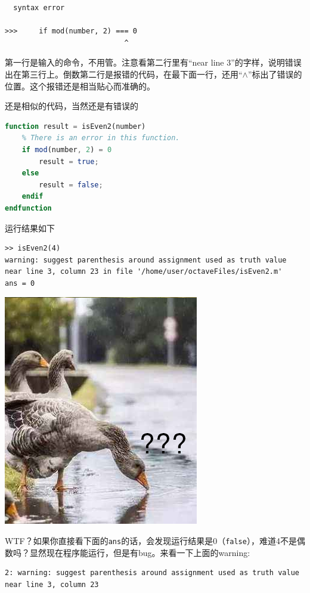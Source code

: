 \documentclass[12pt]{article}
\begin{document}
\begin{spacing}{1.4}
\begin{lstlisting}
  syntax error

>>>     if mod(number, 2) === 0
                            ^
\end{lstlisting}

第一行是输入的命令，不用管。注意看第二行里有“near line 3”的字样，说明错误出在第三行上。倒数第二行是报错的代码，在最下面一行，还用“$\wedge$”标出了错误的位置。这个报错还是相当贴心而准确的。

还是相似的代码，当然还是有错误的

\begin{lstlisting}[language=octave]
function result = isEven2(number)
    % There is an error in this function.
    if mod(number, 2) = 0
        result = true;
    else
        result = false;
    endif
endfunction
\end{lstlisting}

运行结果如下

\begin{lstlisting}
>> isEven2(4)
warning: suggest parenthesis around assignment used as truth value near line 3, column 23 in file '/home/user/octaveFiles/isEven2.m'
ans = 0
\end{lstlisting}

\includegraphics{nottingduck_qurstionmark.png}

WTF？如果你直接看下面的\texttt{ans}的话，会发现运行结果是0（\texttt{false}），难道4不是偶数吗？显然现在程序能运行，但是有bug。来看一下上面的warning:

\begin{lstlisting}
2: warning: suggest parenthesis around assignment used as truth value near line 3, column 23
\end{lstlisting}


\end{spacing}
\end{document}
